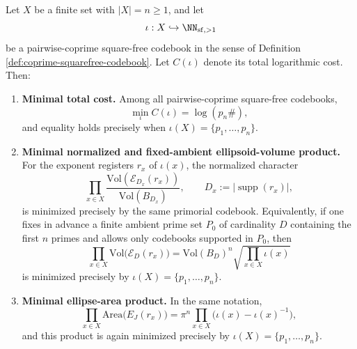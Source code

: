\begin{theorem}\label{thm:primorial-min-total-log-cost}
Let \(X\) be a finite set with \(|X|=n\ge 1\), and let
\[
\iota:X\hookrightarrow \NN_{\mathrm{sf},>1}
\]
be a pairwise-coprime square-free codebook in the sense of Definition \ref{def:coprime-squarefree-codebook}. Let \(C(\iota)\) denote its total logarithmic cost. Then:
\begin{enumerate}
  \item \textbf{Minimal total cost.}
  Among all pairwise-coprime square-free codebooks,
  \[
  \min_{\iota}C(\iota)=\log(p_n\#),
  \]
  and equality holds precisely when \(\iota(X)=\{p_1,\dots,p_n\}\).

  \item \textbf{Minimal normalized and fixed-ambient ellipsoid-volume product.}
  For the exponent registers \(r_x\) of \(\iota(x)\), the normalized character
  \[
  \prod_{x\in X}\frac{\mathrm{Vol}(\mathcal E_{D_x}(r_x))}{\mathrm{Vol}(B_{D_x})},
  \qquad D_x:=|\operatorname{supp}(r_x)|,
  \]
  is minimized precisely by the same primorial codebook. Equivalently, if one fixes in advance a finite ambient prime set \(P_0\) of cardinality \(D\) containing the first \(n\) primes and allows only codebooks supported in \(P_0\), then
  \[
  \prod_{x\in X}\mathrm{Vol}\bigl(\mathcal E_D(r_x)\bigr)
  =\mathrm{Vol}(B_D)^n\sqrt{\prod_{x\in X}\iota(x)}
  \]
  is minimized precisely by \(\iota(X)=\{p_1,\dots,p_n\}\).

  \item \textbf{Minimal ellipse-area product.}
  In the same notation,
  \[
  \prod_{x\in X}\mathrm{Area}\bigl(E_J(r_x)\bigr)
  =
  \pi^n\prod_{x\in X}\bigl(\iota(x)-\iota(x)^{-1}\bigr),
  \]
  and this product is again minimized precisely by \(\iota(X)=\{p_1,\dots,p_n\}\).
\end{enumerate}
\end{theorem}


